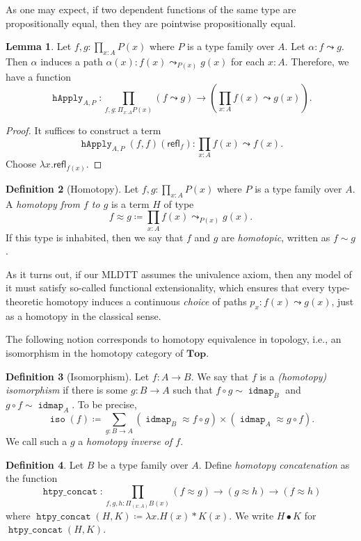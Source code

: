 \documentclass[10pt,letterpaper,cm]{nupset}
\theoremstyle{definition}
\newtheorem{definition}{Definition}[subsection]
\theoremstyle{theorem}
\newtheorem{lemma}[definition]{Lemma}
\theoremstyle{remark}
\newcommand{\refl}{\mathsf{refl}}
\newcommand{\0}{\mathbf{0}}
\newcommand{\1}{\mathbf{1}}
\newcommand{\2}{\mathbf{2}}
\DeclareMathOperator{\idmap}{\mathtt{idmap}}
\DeclareMathOperator{\happly}{\mathtt{hApply}}
\DeclareMathOperator{\iso}{\mathtt{iso}}
\DeclareMathOperator{\hpyconcat}{\mathtt{htpy\_concat}}
\begin{document}
As one may expect, if two dependent functions of the same type are propositionally equal, then they are pointwise propositionally equal. 

\begin{lemma}
Let $f,g: \prod_{x:A} P(x)$ where $P$ is a type family over $A$. Let $\alpha : f \leadsto g$. Then $\alpha$ induces a path $\alpha(x) :f(x) \leadsto_{P(x)} g(x)$ for each $x:A$. Therefore, we have a function $$\happly_{A,P} : \prod_{f, g:  \Pi_{x:A} P(x)} \left(f\leadsto g\right) \to \left(\prod_{x:A} f(x)\leadsto g(x) \right).$$
\end{lemma}
\begin{proof}
It suffices to construct a term $$\happly_{A,P}(f, f)(\refl_f) : \prod_{x:A} f(x) \leadsto f(x).$$ Choose $\lambda x. \refl_{f(x)}$.
\end{proof}

\begin{definition}[Homotopy]
Let $f,g: \prod_{x:A} P(x)$ where $P$ is a type family over $A$. A \textit{homotopy from $f$ to $g$} is a term $H$ of type $$f\approx g \coloneqq \prod_{x:A} f(x) \leadsto_{P(x)} g(x)  .$$ If this type is inhabited, then we say that $f$ and $g$ are \textit{homotopic}, written as $f\sim g$.
\end{definition}

As it turns out, if our MLDTT assumes the univalence axiom, then any model of it must satisfy so-called functional extensionality, which ensures that every type-theoretic homotopy induces a continuous \emph{choice} of paths $p_x : f(x) \leadsto g(x)$, just as a  homotopy in  the classical sense.

\medskip

The following notion corresponds to homotopy equivalence in topology, i.e., an isomorphism in the homotopy category of $\mathbf{Top}$.

\begin{definition}[Isomorphism]
Let $f: A \to B$. We say that $f$ is a \textit{(homotopy) isomorphism} if there is some $g:  B \to A$ such that $f \circ g \sim \idmap_B$ and $g\circ f \sim \idmap_A$. To be precise, $$\iso(f) \coloneqq \sum_{g:B \to A} \left(\idmap_B \approx f\circ g\right) \times  \left(\idmap_A \approx g\circ f\right).$$ We call such a $g$ a \textit{homotopy inverse of $f$}.

\end{definition} 

\begin{definition} Let $B$ be a type family over $A$.
 Define \textit{homotopy concatenation} as the function $$\hpyconcat : \prod_{f, g, h : \Pi_{(x : A)} B(x)}\left(f \approx g\right) \rightarrow \left(g \approx h\right) \rightarrow \left(f \approx h\right)$$ where $\hpyconcat(H, K) \coloneqq \lambda x. H(x) \ast K(x)$. We write $H\bullet K$ for $\hpyconcat(H, K)$. 
\end{definition}
\end{document}
